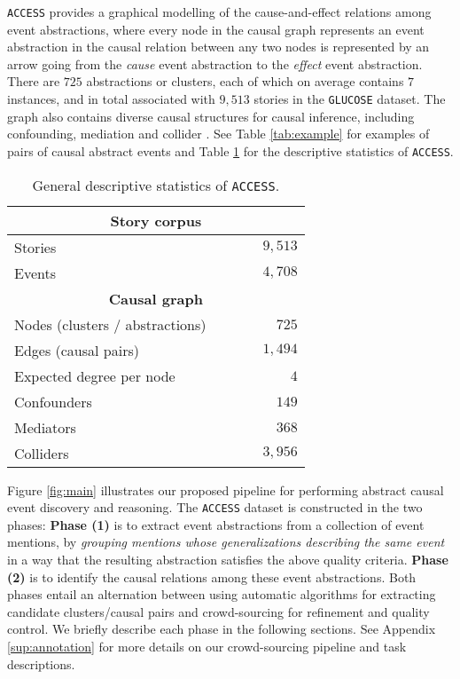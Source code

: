\texttt{ACCESS} provides a graphical modelling of the cause-and-effect relations among event abstractions, where every node in the causal graph represents an event abstraction in the causal relation between any two nodes is represented by an arrow going from the \textit{cause} event abstraction to the \textit{effect} event abstraction. There are $725$ abstractions or clusters, each of which on average contains $7$ instances, and in total associated with $9,513$ stories in the \texttt{GLUCOSE} dataset. The graph also contains diverse causal structures for causal inference, including confounding, mediation and collider \citep{pearl2009causality}. See Table \ref{tab:example} for examples of pairs of causal abstract events and Table \ref{tab:stats} for the descriptive statistics of \texttt{ACCESS}.

\begin{table}[h!]
    \centering
    \begin{tabular}{l|c c c r}
    \hline
    \multicolumn{5}{c}{\cellcolor[HTML]{C0C0C0}\textbf{Story corpus}}            \\ 
    \toprule
         Stories & & & & $9,513$  \\
         Events & & & & $4,708$  \\
         \hline
     \multicolumn{5}{c}{\cellcolor[HTML]{C0C0C0}\textbf{Causal graph}}            \\ \toprule
         Nodes (clusters / abstractions) & & & &  $725$  \\
         Edges (causal pairs) & & & &  $1,494$  \\ 
         Expected degree per node & & & &  $4$ \\
         Confounders & & & &  $149$  \\
         Mediators & & & &  $368$  \\
         Colliders & & & &  $3,956$  \\
         \bottomrule
    \end{tabular}
    \caption{General descriptive statistics of \texttt{ACCESS}.}
    \label{tab:stats}
\end{table}

Figure \ref{fig:main} illustrates our proposed pipeline for performing abstract causal event discovery and reasoning. The \texttt{ACCESS} dataset is constructed in the two phases: \textbf{Phase (1)} is to extract event abstractions from a collection of event mentions, by \textit{grouping mentions whose generalizations describing the same event} in a way that the resulting abstraction satisfies the above quality criteria. \textbf{Phase (2)} is to identify the causal relations among these event abstractions. Both phases entail an alternation between using automatic algorithms for extracting candidate clusters/causal pairs and crowd-sourcing for refinement and quality control. We briefly describe each phase in the following sections. See Appendix \ref{sup:annotation} for more details on our crowd-sourcing pipeline and task descriptions.

